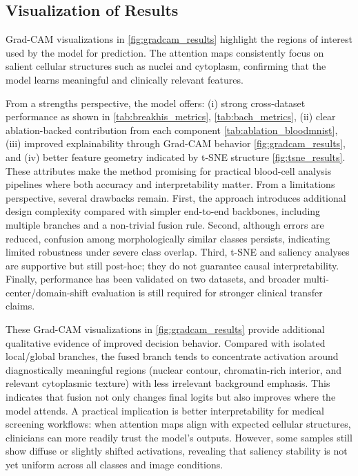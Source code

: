 \documentclass[preprint,12pt]{elsarticle}
\begin{document}
\FloatBarrier
\subsection{Visualization of Results}
Grad-CAM visualizations in \autoref{fig:gradcam_results} highlight the regions of interest used by the model for prediction. The attention maps consistently focus on salient cellular structures such as nuclei and cytoplasm, confirming that the model learns meaningful and clinically relevant features.

From a strengths perspective, the model offers: (i) strong cross-dataset performance as shown in \autoref{tab:breakhis_metrics}, \autoref{tab:bach_metrics}, (ii) clear ablation-backed contribution from each component \autoref{tab:ablation_bloodmnist}, (iii) improved explainability through Grad-CAM behavior \autoref{fig:gradcam_results}, and (iv) better feature geometry indicated by t-SNE structure \autoref{fig:tsne_results}. These attributes make the method promising for practical blood-cell analysis pipelines where both accuracy and interpretability matter. From a limitations perspective, several drawbacks remain. First, the approach introduces additional design complexity compared with simpler end-to-end backbones, including multiple branches and a non-trivial fusion rule. Second, although errors are reduced, confusion among morphologically similar classes persists, indicating limited robustness under severe class overlap. Third, t-SNE and saliency analyses are supportive but still post-hoc; they do not guarantee causal interpretability. Finally, performance has been validated on two datasets, and broader multi-center/domain-shift evaluation is still required for stronger clinical transfer claims.

These Grad-CAM visualizations in \autoref{fig:gradcam_results} provide additional qualitative evidence of improved decision behavior. Compared with isolated local/global branches, the fused branch tends to concentrate activation around diagnostically meaningful regions (nuclear contour, chromatin-rich interior, and relevant cytoplasmic texture) with less irrelevant background emphasis. This indicates that fusion not only changes final logits but also improves where the model attends. A practical implication is better interpretability for medical screening workflows: when attention maps align with expected cellular structures, clinicians can more readily trust the model’s outputs. However, some samples still show diffuse or slightly shifted activations, revealing that saliency stability is not yet uniform across all classes and image conditions.
\end{document}
